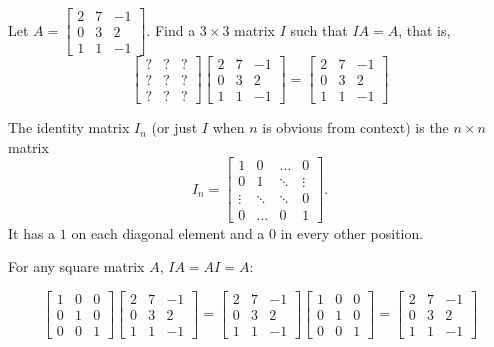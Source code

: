 \begin{applicationActivities}
\begin{activity}{5}
Let $A=\begin{bmatrix} 2 & 7 & -1 \\ 0 & 3 & 2 \\ 1 & 1 & -1 \end{bmatrix}$.  Find a $3 \times 3$ matrix $I$ such that $IA=A$, that is,
\[
  \begin{bmatrix} ? & ? & ? \\ ? & ? & ? \\ ? & ? & ? \end{bmatrix}
  \begin{bmatrix} 2 & 7 & -1 \\ 0 & 3 & 2 \\ 1 & 1 & -1 \end{bmatrix}
=
  \begin{bmatrix} 2 & 7 & -1 \\ 0 & 3 & 2 \\ 1 & 1 & -1 \end{bmatrix}
\]
\end{activity}

\begin{definition}
The identity matrix $I_n$ (or just $I$ when $n$ is obvious from context) is  the $n \times n$ matrix $$I_n = \begin{bmatrix} 1 & 0  & \hdots & 0 \\ 0 & 1 & \ddots & \vdots  \\ \vdots & \ddots & \ddots & 0 \\ 0 & \hdots & 0 & 1 \end{bmatrix}.$$
It has a $1$ on each diagonal element and a $0$ in every other position.
\end{definition}

\begin{fact}
  For any square matrix \(A\), \(IA=AI=A\):

  \[
    \begin{bmatrix} 1 & 0 & 0 \\ 0 & 1 & 0 \\ 0 & 0 & 1 \end{bmatrix}
    \begin{bmatrix} 2 & 7 & -1 \\ 0 & 3 & 2 \\ 1 & 1 & -1 \end{bmatrix}
  =
    \begin{bmatrix} 2 & 7 & -1 \\ 0 & 3 & 2 \\ 1 & 1 & -1 \end{bmatrix}
      \begin{bmatrix} 1 & 0 & 0 \\ 0 & 1 & 0 \\ 0 & 0 & 1 \end{bmatrix}
  =
    \begin{bmatrix} 2 & 7 & -1 \\ 0 & 3 & 2 \\ 1 & 1 & -1 \end{bmatrix}
  \]
\end{fact}


\end{applicationActivities}
